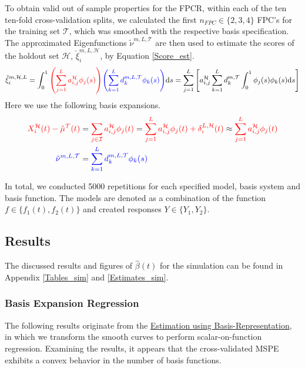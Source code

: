 \documentclass[11pt,twoside,a4paper]{article}
\begin{document}
		To obtain valid out of sample properties for the FPCR, within each of the ten ten-fold cross-validation splits, we calculated the first $n_{FPC} \in \{2,3,4\}$ FPC's for the training set $\mathcal{T}$, which was smoothed with the respective basis specification. The approximated Eigenfunctions $\tilde{\nu}^{m, L, \mathcal{T}}$ are then used to estimate the scores of the holdout set $\mathcal{H}$, $\check{\xi}_{i}^{m, L, \mathcal{H}}$,  by Equation \ref{Score_est}.
		\begin{equation}\label{Score_est}
			\check{\xi}_{i}^{m, \mathcal{H},L}
			= \int_{0}^{1} {\color{red}\left(\sum_{j = 1}^{L} a_{i,j}^{\mathcal{H}} \phi_j(s)\right)} {\color{blue}\left(\sum_{k = 1}^{L} d_{k}^{m, L, \mathcal{T}} \phi_{k}(s)\right)} \mathrm{d}s
		    = \sum_{j = 1}^{L} \left[ a_{i,j}^{\mathcal{H}}\sum_{k = 1}^{L}  d_{k}^{m, \mathcal{T}} \int_{0}^{1} \phi_j(s) \phi_{k}(s)\mathrm{d}s\right]
		\end{equation}
		Here we use the following basis expansions.
		\begin{equation}
			\begin{split}
				{\color{red} X_{i}^{\mathcal{H}}(t) - \hat{\mu}^{\mathcal{T}}(t)} 
				&= {\color{red}\sum_{j \in \mathcal{I}} a_{i,j}^{\mathcal{H}} \phi_j(t)}
				= {\color{red}\sum_{j = 1}^{L} a_{i,j}^{\mathcal{H}} \phi_j(t) + \delta_{i}^{L, \mathcal{H}}(t)}
				\approx {\color{red}\sum_{j = 1}^{L} a_{i,j}^{\mathcal{H}} \phi_j(t)} \\
				{\color{blue}\tilde{\nu}^{m, L, \mathcal{T}} } &= {\color{blue}\sum_{k = 1}^{L} d_{k}^{m, L, \mathcal{T}} \phi_{k}(s)}
			\end{split}
		\end{equation}
		
		In total, we conducted 5000 repetitions for each specified model, basis system and basis function. The models are denoted as a combination of the function $f \in \{f_1(t), f_2(t)\}$	and created responses $Y \in \{Y_1, Y_2\}$.
		
	\subsection{Results}	
	The discussed results and figures of $\hat{\beta}(t)$ for the simulation can be found in Appendix \ref{Tables_sim} and \ref{Estimates_sim}.
	 
	\subsubsection{Basis Expansion Regression}
	The following results originate from the \hyperref[basis_exp_transf]{Estimation using Basis-Representation}, in which we transform the smooth curves to perform scalar-on-function regression. Examining the results, it appears that the cross-validated MSPE exhibits a convex behavior in the number of basis functions.
	
\end{document}
